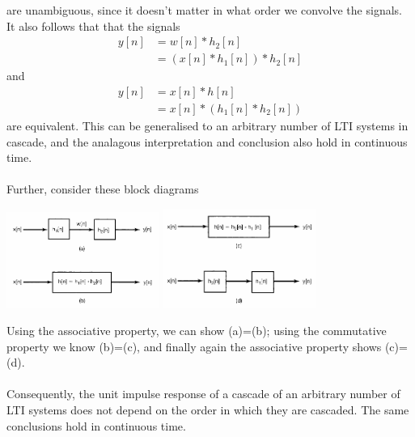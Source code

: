 \documentclass{report}
\begin{document}
are unambiguous, since it doesn't matter in what order we convolve the signals. It also follows that that the signals
\begin{align*}
y[n]&=w[n]*h_2[n]\\
&=(x[n]*h_1[n])*h_2[n]
\end{align*}
and 
\begin{align*}
y[n]&=x[n]*h[n]\\
&=x[n]*(h_1[n]*h_2[n])
\end{align*}
are equivalent. This can be generalised to an arbitrary number of LTI systems in cascade, and the analagous interpretation and
conclusion also hold in continuous time.\\
\vspace{1mm}\\
Further, consider these block diagrams
\begin{center}
\includegraphics[width=5cm]{a45}
\includegraphics[width=5cm]{a46}
\end{center}
Using the associative property, we can show (a)=(b); using the commutative property we know (b)=(c), and finally 
again the associative property shows (c)=(d).\\
\vspace{1mm}\\
Consequently, the unit impulse response of a cascade of an arbitrary number of
LTI systems does not depend on the order in which they are cascaded. The same conclusions hold in continuous time.
\newpage
\end{document}
